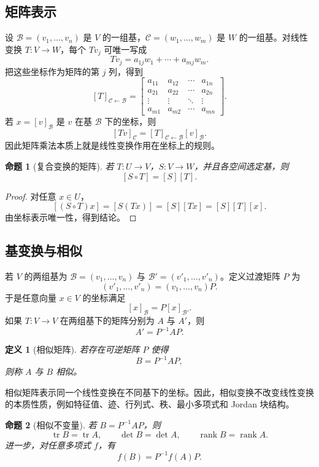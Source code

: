 \documentclass[UTF8,openany,zihao=-4]{ctexbook}
\theoremstyle{cnplain}
\newtheorem{definition}{定义}[chapter]
\newtheorem{proposition}{命题}[chapter]
\newcommand{\rank}{\operatorname{rank}}
\newcommand{\tr}{\operatorname{tr}}
\begin{document}
\subsection{矩阵表示}

设 $\mathcal B=(v_1,
\ldots,v_n)$ 是 $V$ 的一组基，$\mathcal C=(w_1,
\ldots,w_m)$ 是 $W$ 的一组基。对线性变换 $T:V\to W$，每个 $Tv_j$ 可唯一写成
\[
Tv_j=a_{1j}w_1+
\cdots+a_{mj}w_m.
\]
把这些坐标作为矩阵的第 $j$ 列，得到
\[
[T]_{\mathcal C\leftarrow\mathcal B}
=\begin{bmatrix}
a_{11}&a_{12}&\cdots&a_{1n}\\
a_{21}&a_{22}&\cdots&a_{2n}\\
\vdots&\vdots&\ddots&\vdots\\
a_{m1}&a_{m2}&\cdots&a_{mn}
\end{bmatrix}.
\]
若 $x=[v]_{\mathcal B}$ 是 $v$ 在基 $\mathcal B$ 下的坐标，则
\[
[Tv]_{\mathcal C}=[T]_{\mathcal C\leftarrow\mathcal B}[v]_{\mathcal B}.
\]
因此矩阵乘法本质上就是线性变换作用在坐标上的规则。

\begin{proposition}[复合变换的矩阵]
若 $T:U\to V$，$S:V\to W$，并且各空间选定基，则
\[
[S\circ T]=[S][T].
\]
\end{proposition}

\begin{proof}
对任意 $x\in U$，
\[
[(S\circ T)x]=[S(Tx)]=[S][Tx]=[S][T][x].
\]
由坐标表示唯一性，得到结论。
\end{proof}

\subsection{基变换与相似}

若 $V$ 的两组基为 $\mathcal B=(v_1,
\ldots,v_n)$ 与 $\mathcal B'=(v'_1,
\ldots,v'_n)$。定义过渡矩阵 $P$ 为
\[
(v'_1,
\ldots,v'_n)=(v_1,
\ldots,v_n)P.
\]
于是任意向量 $x\in V$ 的坐标满足
\[
[x]_{\mathcal B}=P[x]_{\mathcal B'}.
\]
如果 $T:V\to V$ 在两组基下的矩阵分别为 $A$ 与 $A'$，则
\[
A'=P^{-1}AP.
\]

\begin{definition}[相似矩阵]
若存在可逆矩阵 $P$ 使得
\[
B=P^{-1}AP,
\]
则称 $A$ 与 $B$ 相似。
\end{definition}

相似矩阵表示同一个线性变换在不同基下的坐标。因此，相似变换不改变线性变换的本质性质，例如特征值、迹、行列式、秩、最小多项式和 Jordan 块结构。

\begin{proposition}[相似不变量]
若 $B=P^{-1}AP$，则
\[
\tr B=\tr A,
\qquad
\det B=\det A,
\qquad
\rank B=\rank A.
\]
进一步，对任意多项式 $f$，有
\[
f(B)=P^{-1}f(A)P.
\]
\end{proposition}
\end{document}
